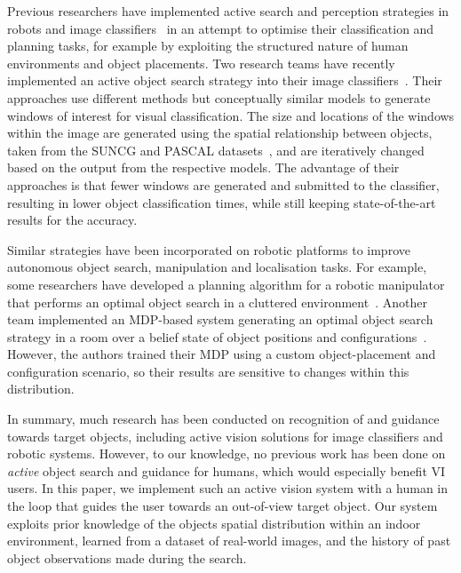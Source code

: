 \documentclass[a4paper, twoside]{article}
\begin{document}
Previous researchers have implemented active search and perception strategies in robots and image classifiers~\cite{Bajcsy2017} in an attempt to optimise their classification and planning tasks, for example by exploiting the structured nature of human environments and object placements. 
%
Two research teams have recently implemented an active object search strategy into their image classifiers~\cite{caicedo2015active,gonzalez2015active}. Their approaches use different methods but conceptually similar models to generate windows of interest for visual classification. The size and locations of the windows within the image are generated using the spatial relationship between objects, taken from the SUNCG and PASCAL datasets~\cite{song2016ssc,Everingham10}, and are iteratively changed based on the output from the respective models. The advantage of their approaches is that fewer windows are generated and submitted to the classifier, resulting in lower object classification times, while still keeping state-of-the-art results for the accuracy. 

Similar strategies have been incorporated on robotic platforms to improve autonomous object search, manipulation and localisation tasks. For example, some researchers have developed a planning algorithm for a robotic manipulator that performs an optimal object search in a cluttered environment~\cite{dogar2014object}. Another team implemented an MDP-based system generating an optimal object search strategy in a room over a belief state of object positions and configurations~\cite{aydemir2011search}. However, the authors trained their MDP using a custom object-placement and configuration scenario, so their results are sensitive to changes within this distribution. 

In summary, much research has been conducted on recognition of and guidance towards target objects, including active vision solutions for image classifiers and robotic systems. However, to our knowledge, no previous work has been done on {\em active} object search and guidance for humans, which would especially benefit VI users. In this paper, we implement such an active vision system with a human in the loop
that guides the user towards an out-of-view target object. Our system exploits prior knowledge of the objects spatial distribution within an indoor environment, learned from a dataset of real-world images, and the history of past object observations made during the search.
\end{document}
